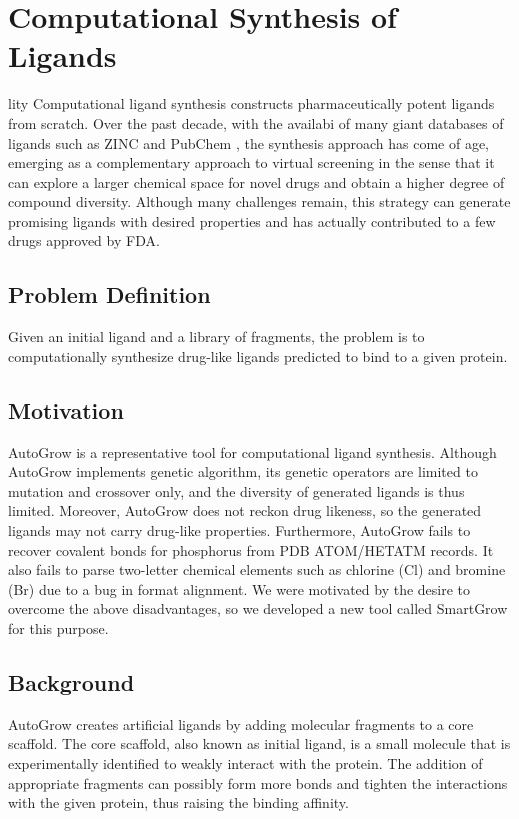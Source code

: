 \chapter{Computational Synthesis of Ligands}
lity
Computational ligand synthesis constructs pharmaceutically potent ligands from scratch. Over the past decade, with the availabi of many giant databases of ligands such as ZINC \citep{532-2005} and PubChem \citep{527-2008,526-2009}, the synthesis approach has come of age, emerging as a complementary approach to virtual screening in the sense that it can explore a larger chemical space for novel drugs and obtain a higher degree of compound diversity. Although many challenges remain, this strategy can generate promising ligands with desired properties and has actually contributed to a few drugs approved by FDA.

\section{Problem Definition}

Given an initial ligand and a library of fragments, the problem is to computationally synthesize drug-like ligands predicted to bind to a given protein.

\section{Motivation}

AutoGrow \citep{466-2009} is a representative tool for computational ligand synthesis. Although AutoGrow implements genetic algorithm, its genetic operators are limited to mutation and crossover only, and the diversity of generated ligands is thus limited. Moreover, AutoGrow does not reckon drug likeness, so the generated ligands may not carry drug-like properties. Furthermore, AutoGrow fails to recover covalent bonds for phosphorus from PDB ATOM/HETATM records. It also fails to parse two-letter chemical elements such as chlorine (Cl) and bromine (Br) due to a bug in format alignment. We were motivated by the desire to overcome the above disadvantages, so we developed a new tool called SmartGrow for this purpose.

\section{Background}

AutoGrow creates artificial ligands by adding molecular fragments to a core scaffold. The core scaffold, also known as initial ligand, is a small molecule that is experimentally identified to weakly interact with the protein. The addition of appropriate fragments can possibly form more bonds and tighten the interactions with the given protein, thus raising the binding affinity.

